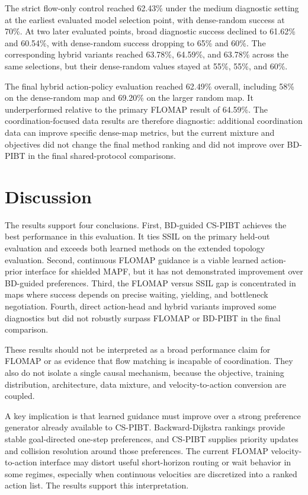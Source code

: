 \documentclass[conference]{IEEEtran}
\begin{document}
The strict flow-only control reached 62.43\% under the medium diagnostic
setting at the earliest evaluated model selection point, with dense-random success at
70\%.  At two later evaluated points, broad diagnostic success declined to
61.62\% and 60.54\%,
with dense-random success dropping to 65\% and 60\%.  The corresponding hybrid
variants reached 63.78\%, 64.59\%, and 63.78\% across the same selections, but
their dense-random values stayed at 55\%, 55\%, and 60\%.

The final hybrid action-policy evaluation reached 62.49\% overall,
including 58\% on the dense-random map and 69.20\% on the larger random map.  It
underperformed relative to the primary FLOMAP result of 64.59\%.  The
coordination-focused data results are therefore diagnostic: additional
coordination data can improve specific dense-map metrics, but the current
mixture and objectives did not change the final method ranking and did not
improve over BD-PIBT in the final shared-protocol comparisons.

\section{Discussion}

The results support four conclusions.  First, BD-guided CS-PIBT achieves the
best performance in this evaluation.  It ties SSIL on the primary
held-out evaluation and exceeds both learned methods on the extended topology
evaluation.  Second, continuous
FLOMAP guidance is a viable learned action-prior interface for shielded
MAPF, but it has not demonstrated improvement over BD-guided preferences.
Third, the FLOMAP versus SSIL gap is concentrated in maps where success
depends on precise waiting, yielding, and bottleneck negotiation.  Fourth,
direct action-head and hybrid variants improved some diagnostics but did not
robustly surpass FLOMAP or BD-PIBT in the final comparison.

These results should not be interpreted as a broad performance claim for
FLOMAP or as evidence that flow matching is incapable of coordination.
They also do not isolate a single causal mechanism, because
the objective, training distribution, architecture, data mixture, and
velocity-to-action conversion are coupled.

A key implication is that learned guidance must improve over a strong
preference generator already available to CS-PIBT.  Backward-Dijkstra rankings
provide stable goal-directed one-step preferences, and CS-PIBT supplies priority
updates and collision resolution around those preferences.  The current
FLOMAP velocity-to-action interface may distort useful short-horizon routing or wait behavior in some
regimes, especially when continuous velocities are discretized into a ranked
action list.  The results support this interpretation.
\end{document}
